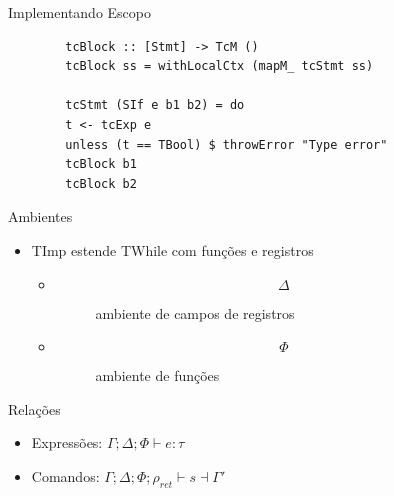 \begin{frame}[fragile]{Implementando Escopo}

    \begin{lstlisting}
        tcBlock :: [Stmt] -> TcM ()
        tcBlock ss = withLocalCtx (mapM_ tcStmt ss)

        tcStmt (SIf e b1 b2) = do
        t <- tcExp e
        unless (t == TBool) $ throwError "Type error"
        tcBlock b1
        tcBlock b2
    \end{lstlisting}
\end{frame}



\begin{frame}{Ambientes}

    \begin{itemize}

        \item
        TImp estende TWhile com funções e registros

        \begin{itemize}
            \item
            \begin{description}

                \item[\[\Delta\]]
                ambiente de campos de registros
            \end{description}
            \item
            \begin{description}

                \item[\[\Phi\]]
                ambiente de funções
            \end{description}
        \end{itemize}
    \end{itemize}
\end{frame}

\begin{frame}{Relações}

    \begin{itemize}

        \item
        Expressões: \(\Gamma;\Delta;\Phi \vdash e : \tau\)
        \item
        Comandos:
        \(\Gamma;\Delta;\Phi;\rho_\mathit{ret} \vdash s \dashv \Gamma'\)
    \end{itemize}
\end{frame}

